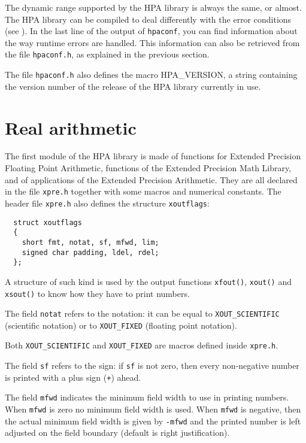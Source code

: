 \documentclass{article}
\begin{document}
The dynamic range supported by the HPA library is always the same, or almost.
The HPA library can be compiled to deal differently with
the error conditions (see ).
In the last line of the output of \texttt{hpaconf}, you can find
information about the way runtime errors are handled.
This information can also be retrieved from the file
\texttt{hpaconf.h}, as explained in the previous section.

The file \texttt{hpaconf.h} also defines the macro HPA\_VERSION, a string
containing the version number of the release of the
HPA library currently in use.


\hypertarget{real_arith}{}
\section{Real arithmetic}
The first module of the HPA library is made of functions for 
Extended Precision Floating Point Arithmetic, functions of the 
Extended Precision Math Library, and of applications of the Extended 
Precision Arithmetic. They are all declared in the file \texttt{xpre.h}
together with some macros and numerical constants.
The header file \texttt{xpre.h} also defines the structure \texttt{xoutflags}:

\begin{verbatim}
  struct xoutflags
  {
    short fmt, notat, sf, mfwd, lim;
    signed char padding, ldel, rdel;
  };
\end{verbatim}
A structure of such kind is used by the output functions
\texttt{xfout()}, \texttt{xout()} and \texttt{xsout()} to know how they have to print
numbers.

The field \texttt{notat} refers to the notation: it can
be equal to \texttt{XOUT\_SCIENTIFIC} (scientific notation) or to \texttt{XOUT\_FIXED}
(floating point notation). 

Both \texttt{XOUT\_SCIENTIFIC} and \texttt{XOUT\_FIXED} are
macros defined inside \texttt{xpre.h}.

The field \texttt{sf} refers to the sign: if \texttt{sf} is not zero, then every non-negative
number is printed with a plus sign (\texttt{+}) ahead.

The field \texttt{mfwd} indicates the minimum field width to use in
printing numbers. When \texttt{mfwd} is zero no minimum field width is used.
When \texttt{mfwd} is negative, then the actual minimum field width is given
by \texttt{-mfwd} and the printed number is left adjusted on the
field boundary (default is right justification).
\end{document}
